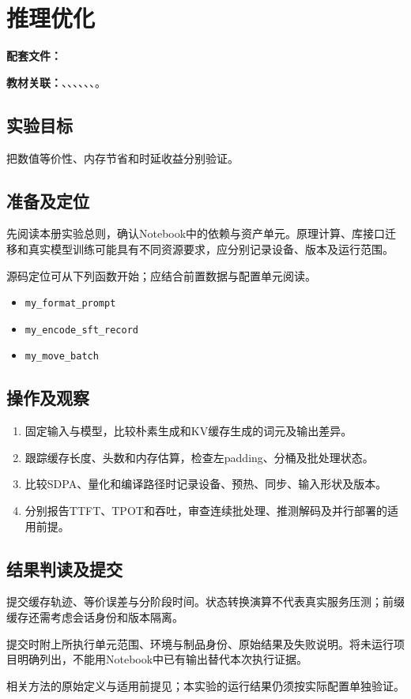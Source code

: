 \chapter{推理优化}
\label{lab:A50_inference_optimization}

\noindent\textbf{配套文件：}\par
\noindent\textbf{教材关联：}、、、、、、。

\section*{实验目标}
把数值等价性、内存节省和时延收益分别验证。

\section*{准备及定位}
先阅读本册实验总则，确认Notebook中的依赖与资产单元。原理计算、库接口迁移和真实模型训练可能具有不同资源要求，应分别记录设备、版本及运行范围。

源码定位可从下列函数开始；应结合前置数据与配置单元阅读。
\begin{itemize}
\item \texttt{my\_format\_prompt}
\item \texttt{my\_encode\_sft\_record}
\item \texttt{my\_move\_batch}
\end{itemize}

\section*{操作及观察}
\begin{enumerate}
\item 固定输入与模型，比较朴素生成和KV缓存生成的词元及输出差异。
\item 跟踪缓存长度、头数和内存估算，检查左padding、分桶及批处理状态。
\item 比较SDPA、量化和编译路径时记录设备、预热、同步、输入形状及版本。
\item 分别报告TTFT、TPOT和吞吐，审查连续批处理、推测解码及并行部署的适用前提。
\end{enumerate}

\section*{结果判读及提交}
提交缓存轨迹、等价误差与分阶段时间。状态转换演算不代表真实服务压测；前缀缓存还需考虑会话身份和版本隔离。

提交时附上所执行单元范围、环境与制品身份、原始结果及失败说明。将未运行项目明确列出，不能用Notebook中已有输出替代本次执行证据。

相关方法的原始定义与适用前提见\cite{dao2022flashattention,leviathan2023speculative}；本实验的运行结果仍须按实际配置单独验证。
